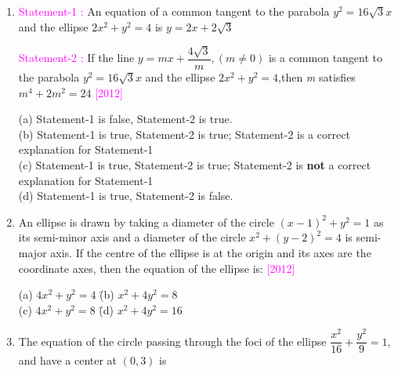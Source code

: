 \documentclass[journal,12pt,twocolumn]{IEEEtran}
\theoremstyle{remark}
\begin{document}
\begin{enumerate}[label=\textcolor{magenta}{\arabic*.}]
    \hfill{\textcolor{magenta}{[2011]}}
    
    \begin{tabbing}
        (a) $5x^2+3y^2-48=0$ \hspace{0em} \= (b) $3x^2+5y^2-15=0$ \\
        (c) $5x^2+3y^2-32=0$ \hspace{0em} \= (d) $3x^2+5y^2-32=0$ \\
    \end{tabbing}
    \item
    \textcolor{magenta}{Statement-1 :} An equation of a common tangent to the parabola $y^2=16\sqrt{3}x$ and the ellipse $2x^2+y^2=4$ is $y=2x+2\sqrt{3}$
    
    \textcolor{magenta}{Statement-2 :} If the line $y=mx+\dfrac{4\sqrt{3}}{m},(m\neq0)$ is a common tangent to the parabola $y^2=16\sqrt{3}x$ and the ellipse $2x^2+y^2=4$,then \textit{m} satisfies $m^4+2m^2=24$ 
    \hfill{\textcolor{magenta}{[2012]}}
    
    (a) Statement-1 is false, Statement-2 is true.\\
    (b) Statement-1 is true, Statement-2 is true; Statement-2
    is a correct explanation for Statement-1\\
    (c) Statement-1 is true, Statement-2 is true; Statement-2
    is \textbf{not} a correct explanation for Statement-1\\
    (d) Statement-1 is true, Statement-2 is false.\\
    \item An ellipse is drawn by taking a diameter of the circle $(x-1)^2+y^2=1$ as its semi-minor axis and a diameter of the circle $x^2+(y-2)^2=4$ is semi-major axis. If the centre of the ellipse is at the origin and its axes are the coordinate axes, then the equation of the ellipse is: 
    \hfill{\textcolor{magenta}{[2012]}}
    
    \begin{tabbing}
        (a) $4x^2+y^2=4$ \hspace{3em} \= (b) $x^2+4y^2=8$ \\
        (c) $4x^2+y^2=8$ \hspace{3em} \= (d) $x^2+4y^2=16$ \\
    \end{tabbing}
    \item The equation of the circle passing through the foci of the ellipse $\dfrac{x^2}{16}+\dfrac{y^2}{9}=1$, and have a center at $(0,3)$ is
    

\end{enumerate}
\end{document}
